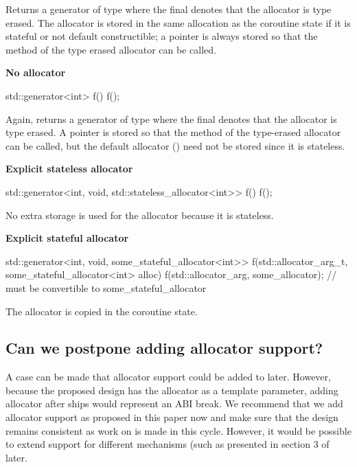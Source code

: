 \documentclass{wg21}
\begin{document}
Returns a generator of type 
where the final  denotes that the allocator is type erased.
The allocator is stored in the same allocation as the coroutine state
if it is stateful or not default constructible; a pointer is always stored so that
the  method of the type erased allocator can be called.

\textbf{No allocator}

\begin{colorblock}
std::generator<int> f() {}
f();
\end{colorblock}

Again, returns a generator of type 
where the final  denotes that the allocator is type erased.
A pointer is stored so that
the  method
of the type-erased allocator can be called,
but the default allocator ()
need not be stored since it is stateless.

\textbf{Explicit stateless allocator}

\begin{colorblock}
std::generator<int, void, std::stateless_allocator<int>> f() {}
f();
\end{colorblock}

No extra storage is used for the allocator because it is stateless.

\textbf{Explicit stateful allocator}

\begin{colorblock}
std::generator<int, void, some_stateful_allocator<int>>
    f(std::allocator_arg_t, some_stateful_allocator<int> alloc) {}
f(std::allocator_arg, some_allocator); // must be convertible to some_stateful_allocator
\end{colorblock}

The allocator is copied in the coroutine state.

\subsection{Can we postpone adding allocator support?}

A case can be made that allocator support could be added to  later.
However, because the proposed design has the allocator as a template parameter,
adding allocator after  ships would represent an ABI break.
We recommend that we add allocator support as proposed in this paper now and make sure that the design remains consistent as work on 
is made in this cycle.
However, it would be possible to extend support for different mechanisms (such as presented in section 3 of  later.
\end{document}
